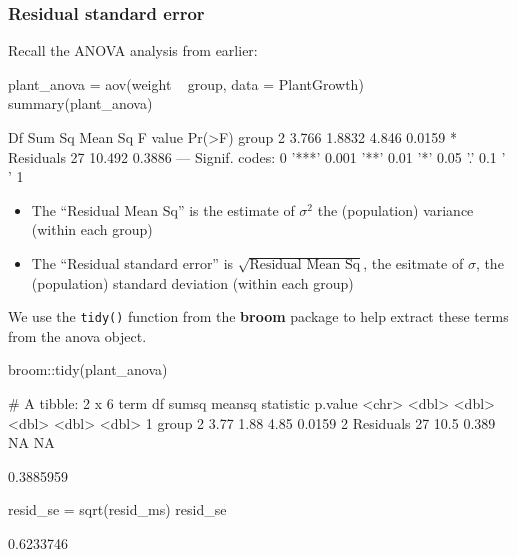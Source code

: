 \documentclass[a4paper]{article}\usepackage[]{graphicx}\usepackage[]{xcolor}
\begin{document}
\subsubsection{Residual standard error}
Recall the ANOVA analysis from earlier:
\begin{Schunk}
\begin{Sinput}
plant_anova = aov(weight ~ group, data = PlantGrowth)
summary(plant_anova)
\end{Sinput}
\begin{Soutput}
            Df Sum Sq Mean Sq F value Pr(>F)  
group        2  3.766  1.8832   4.846 0.0159 *
Residuals   27 10.492  0.3886                 
---
Signif. codes:  0 '***' 0.001 '**' 0.01 '*' 0.05 '.' 0.1 ' ' 1
\end{Soutput}
\end{Schunk}
\begin{itemize}
	\item The ``Residual Mean Sq'' is the estimate of \( \sigma^2 \)  the (population) variance (within each group)
	\item The ``Residual standard error'' is \( \sqrt{\text{Residual Mean Sq}} \), the esitmate of \( \sigma \), the (population) standard deviation (within each group)
\end{itemize}
We use the \lstinline|tidy()| function from the \textbf{broom} package to help extract these terms from the anova object.
\begin{Schunk}
\begin{Sinput}
broom::tidy(plant_anova)
\end{Sinput}
\begin{Soutput}
# A tibble: 2 x 6
  term         df sumsq meansq statistic p.value
  <chr>     <dbl> <dbl>  <dbl>     <dbl>   <dbl>
1 group         2  3.77  1.88       4.85  0.0159
2 Residuals    27 10.5   0.389     NA    NA     
\end{Soutput}
\begin{Soutput}
[1] 0.3885959
\end{Soutput}
\begin{Sinput}
resid_se = sqrt(resid_ms)
resid_se
\end{Sinput}
\begin{Soutput}
[1] 0.6233746
\end{Soutput}
\end{Schunk}
\end{document}
